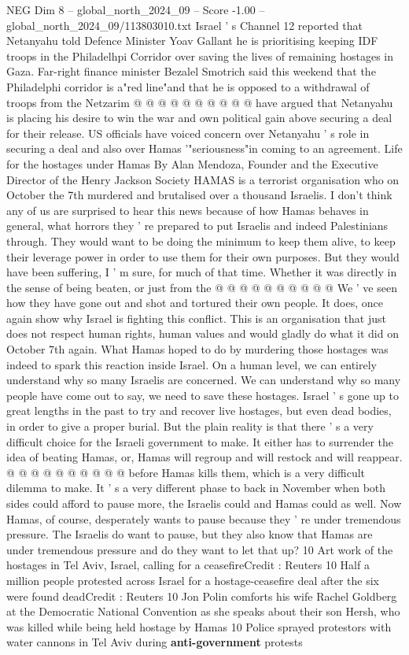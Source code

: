 \begin{textsample}{NEG Dim 8 – global\_north\_2024\_09 – Score -1.00 – global\_north\_2024\_09/113803010.txt}
Israel ' s Channel 12 reported that Netanyahu told Defence Minister Yoav Gallant he is prioritising keeping IDF troops in the Philadelhpi Corridor over saving the lives of remaining hostages in Gaza.
Far-right finance minister Bezalel Smotrich said this weekend that the Philadelphi corridor is a"red line"and that he is opposed to a withdrawal of troops from the Netzarim @ @ @ @ @ @ @ @ @ @ have argued that Netanyahu is placing his desire to win the war and own political gain above securing a deal for their release.
US officials have voiced concern over Netanyahu ' s role in securing a deal and also over Hamas '"seriousness"in coming to an agreement.
Life for the hostages under Hamas By Alan Mendoza, Founder and the Executive Director of the Henry Jackson Society HAMAS is a terrorist organisation who on October the 7th murdered and brutalised over a thousand Israelis.
I don't think any of us are surprised to hear this news because of how Hamas behaves in general, what horrors they ' re prepared to put Israelis and indeed Palestinians through.
They would want to be doing the minimum to keep them alive, to keep their leverage power in order to use them for their own purposes.
But they would have been suffering, I ' m sure, for much of that time.
Whether it was directly in the sense of being beaten, or just from the @ @ @ @ @ @ @ @ @ @ We ' ve seen how they have gone out and shot and tortured their own people.
It does, once again show why Israel is fighting this conflict.
This is an organisation that just does not respect human rights, human values and would gladly do what it did on October 7th again.
What Hamas hoped to do by murdering those hostages was indeed to spark this reaction inside Israel.
On a human level, we can entirely understand why so many Israelis are concerned.
We can understand why so many people have come out to say, we need to save these hostages.
Israel ' s gone up to great lengths in the past to try and recover live hostages, but even dead bodies, in order to give a proper burial.
But the plain reality is that there ' s a very difficult choice for the Israeli government to make.
It either has to surrender the idea of beating Hamas, or, Hamas will regroup and will restock and will reappear. @ @ @ @ @ @ @ @ @ @ before Hamas kills them, which is a very difficult dilemma to make.
It ' s a very different phase to back in November when both sides could afford to pause more, the Israelis could and Hamas could as well.
Now Hamas, of course, desperately wants to pause because they ' re under tremendous pressure.
The Israelis do want to pause, but they also know that Hamas are under tremendous pressure and do they want to let that up? 10 Art work of the hostages in Tel Aviv, Israel, calling for a ceasefireCredit : Reuters 10 Half a million people protested across Israel for a hostage-ceasefire deal after the six were found deadCredit : Reuters 10 Jon Polin comforts his wife Rachel Goldberg at the Democratic National Convention as she speaks about their son Hersh, who was killed while being held hostage by Hamas 10 Police sprayed protestors with water cannons in Tel Aviv during \textbf{anti-government} protests

\end{textsample}

